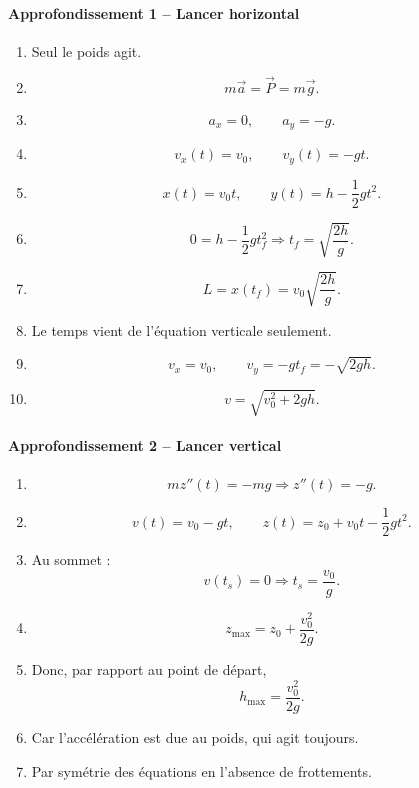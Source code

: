 \documentclass[11pt,a4paper]{article}
\theoremstyle{definition}
\begin{document}
\paragraph{Approfondissement 1 -- Lancer horizontal}
\begin{enumerate}[label=\arabic*.]
    \item Seul le poids agit.
    \item
    \[
    m\vec a=\vec P=m\vec g.
    \]
    \item
    \[
    a_x=0,\qquad a_y=-g.
    \]
    \item
    \[
    v_x(t)=v_0,\qquad v_y(t)=-gt.
    \]
    \item
    \[
    x(t)=v_0t,\qquad y(t)=h-\frac12gt^2.
    \]
    \item
    \[
    0=h-\frac12gt_f^2
    \Rightarrow
    t_f=\sqrt{\frac{2h}{g}}.
    \]
    \item
    \[
    L=x(t_f)=v_0\sqrt{\frac{2h}{g}}.
    \]
    \item Le temps vient de l’équation verticale seulement.
    \item
    \[
    v_x=v_0,\qquad v_y=-gt_f=-\sqrt{2gh}.
    \]
    \item
    \[
    v=\sqrt{v_0^2+2gh}.
    \]
\end{enumerate}

\paragraph{Approfondissement 2 -- Lancer vertical}
\begin{enumerate}[label=\arabic*.]
    \item
    \[
    mz''(t)=-mg \Rightarrow z''(t)=-g.
    \]
    \item
    \[
    v(t)=v_0-gt,\qquad z(t)=z_0+v_0t-\frac12gt^2.
    \]
    \item Au sommet :
    \[
    v(t_s)=0 \Rightarrow t_s=\frac{v_0}{g}.
    \]
    \item
    \[
    z_{\max}=z_0+\frac{v_0^2}{2g}.
    \]
    \item Donc, par rapport au point de départ,
    \[
    h_{\max}=\frac{v_0^2}{2g}.
    \]
    \item Car l’accélération est due au poids, qui agit toujours.
    \item Par symétrie des équations en l’absence de frottements.
\end{enumerate}
\end{document}
